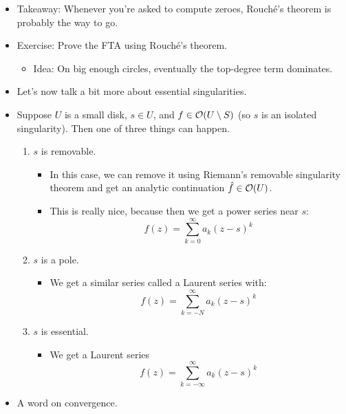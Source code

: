 \documentclass[../notes.tex]{subfiles}
\begin{document}
\begin{itemize}
    \item Takeaway: Whenever you're asked to compute zeroes, Rouch\'{e}'s theorem is probably the way to go.
    \item Exercise: Prove the FTA using Rouch\'{e}'s theorem.
    \begin{itemize}
        \item Idea: On big enough circles, eventually the top-degree term dominates.
    \end{itemize}
    \item Let's now talk a bit more about essential singularities.
    \item Suppose $U$ is a small disk, $s\in U$, and $f\in\mathcal{O}(U\setminus S)$ (so $s$ is an isolated singularity). Then one of three things can happen.
    \begin{enumerate}
        \item $s$ is removable.
        \begin{itemize}
            \item In this case, we can remove it using Riemann's removable singularity theorem and get an analytic continuation $\hat{f}\in\mathcal{O}(U)$.
            \item This is really nice, because then we get a power series near $s$:
            \begin{equation*}
                f(z) = \sum_{k=0}^\infty a_k(z-s)^k
            \end{equation*}
        \end{itemize}
        \item $s$ is a pole.
        \begin{itemize}
            \item We get a similar series called a Laurent series with:
            \begin{equation*}
                f(z) = \sum_{k=-N}^\infty a_k(z-s)^k
            \end{equation*}
        \end{itemize}
        \item $s$ is essential.
        \begin{itemize}
            \item We get a Laurent series
            \begin{equation*}
                f(z) = \sum_{k=-\infty}^\infty a_k(z-s)^k
            \end{equation*}
        \end{itemize}
    \end{enumerate}
    \item A word on convergence.

\end{itemize}
\end{document}
